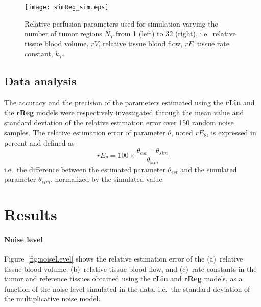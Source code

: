 \begin{figure}
\texttt{[image: simReg\_sim.eps]}
\caption{Relative perfusion parameters used for simulation varying the number of tumor regions $N_T$ from 1 (left) to 32 (right), i.e.~relative tissue blood volume, $rV$, relative tissue blood flow, $rF$, tissue rate constant, $k_T$.}
\label{fig:simReg}
\end{figure}

\subsection{Data analysis}\label{sec:dataAnalysis}
The accuracy and the precision of the parameters estimated using the \textbf{rLin} and the \textbf{rReg} models were respectively investigated through the mean value and standard deviation of the relative estimation error over 150 random noise samples.
The relative estimation error of parameter $\theta$, noted $rE_{\theta}$, is expressed in percent and defined as
\begin{equation}
rE_{\theta} = 100 \times \frac{\theta_{est}-\theta_{sim}}{\theta_{sim}}
\end{equation}
i.e.~the difference between the estimated parameter $\theta_{est}$ and the simulated parameter $\theta_{sim}$, normalized by the simulated value.

\section{Results}
\paragraph{Noise level}
Figure~\ref{fig:noiseLevel} shows the relative estimation error of the (a)~relative tissue blood volume, (b)~relative tissue blood flow, and (c)~rate constants in the tumor and reference tissues obtained using the \textbf{rLin} and \textbf{rReg} models, as a function of the noise level simulated in the data, i.e.~the standard deviation of the multiplicative noise model.


